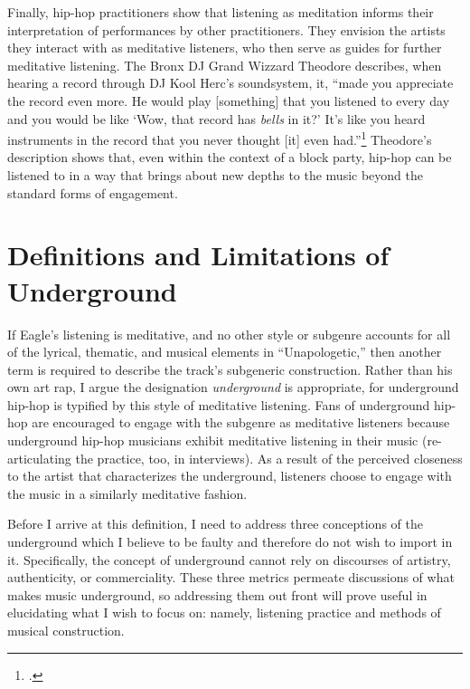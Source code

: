 Finally, hip-hop practitioners show that listening as meditation informs their interpretation of performances 
by other practitioners. They envision the artists they interact with as meditative listeners, who then serve
as guides for further meditative listening. The Bronx DJ Grand Wizzard Theodore describes, when hearing a 
record through DJ Kool Herc's soundsystem, it, ``made you appreciate the record even more. He would play 
[something] that you listened to every day and you would be like `Wow, that record has \emph{bells} in it?' 
It's like you heard instruments in the record that you never thought [it] even had.''\footnote{
    \autocite[139]{christabronGlassHiphopProduction2015}.} 
Theodore's description shows that, even within the context of a block party, hip-hop can be listened to
in a way that brings about new depths to the music beyond the standard forms of engagement.

\section{Definitions and Limitations of Underground} \label{undergrounddeflims}

If Eagle's listening is meditative, and no other style or subgenre accounts for all of the lyrical, thematic,
and musical elements in ``Unapologetic,'' then another term is required to describe the track's subgeneric
construction. Rather than his own art rap, I argue the designation \emph{underground} is appropriate, for
underground hip-hop is typified by this style of meditative listening. Fans of underground hip-hop are 
encouraged to engage with the subgenre  as meditative listeners because underground hip-hop musicians exhibit
meditative listening in their music (re-articulating the practice, too, in interviews). As a result of the 
perceived closeness to the artist that characterizes the underground, listeners choose to engage with the music
in a similarly meditative fashion.

Before I arrive at this definition, I need to address three conceptions of the underground which I believe to
be faulty and therefore do not wish to import in it. Specifically, the concept of underground cannot rely on 
discourses of artistry, authenticity, or commerciality. These three metrics permeate discussions of what makes
music underground, so addressing them out front will prove useful in elucidating what I wish to focus on: namely,
listening practice and methods of musical construction.

